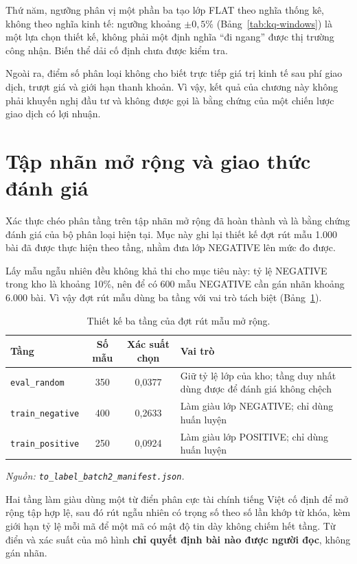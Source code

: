 Thứ năm, ngưỡng phân vị một phần ba tạo lớp FLAT theo nghĩa thống kê, không theo nghĩa kinh
tế: ngưỡng khoảng $\pm0{,}5\%$ (Bảng~\ref{tab:kq-windows}) là một lựa chọn thiết kế, không
phải một định nghĩa ``đi ngang'' được thị trường công nhận. Biến thể dải cố định chưa được
kiểm tra.

Ngoài ra, điểm số phân loại không cho biết trực tiếp giá trị kinh tế sau phí giao dịch,
trượt giá và giới hạn thanh khoản. Vì vậy, kết quả của chương này không phải khuyến nghị
đầu tư và không được gọi là bằng chứng của một chiến lược giao dịch có lợi nhuận.

\section{Tập nhãn mở rộng và giao thức đánh giá}
\label{sec:kq-mornhan}

Xác thực chéo phân tầng trên tập nhãn mở rộng đã hoàn thành và là bằng chứng đánh giá của
bộ phân loại hiện tại. Mục này ghi lại thiết kế đợt rút mẫu 1.000 bài đã được thực hiện
theo tầng, nhằm đưa lớp NEGATIVE lên mức đo được.

Lấy mẫu ngẫu nhiên đều không khả thi cho mục tiêu này: tỷ lệ NEGATIVE trong kho là khoảng
10\%, nên để có 600 mẫu NEGATIVE cần gán nhãn khoảng 6.000 bài. Vì vậy đợt rút mẫu dùng ba
tầng với vai trò tách biệt (Bảng~\ref{tab:kq-strata}).

\begin{table}[H]
  \centering
  \caption{Thiết kế ba tầng của đợt rút mẫu mở rộng.}
  \label{tab:kq-strata}
  \begin{tabular}{p{3.0cm} c c p{5.2cm}}
    \toprule
    Tầng & Số mẫu & Xác suất chọn & Vai trò \\
    \midrule
    \texttt{eval\_random} & 350 & 0,0377 & Giữ tỷ lệ lớp của kho; tầng duy nhất dùng được để đánh giá không chệch \\
    \texttt{train\_negative} & 400 & 0,2633 & Làm giàu lớp NEGATIVE; chỉ dùng huấn luyện \\
    \texttt{train\_positive} & 250 & 0,0924 & Làm giàu lớp POSITIVE; chỉ dùng huấn luyện \\
    \bottomrule
  \end{tabular}
\noindent\textit{Nguồn: \texttt{to\_label\_batch2\_manifest.json}.}
\end{table}

Hai tầng làm giàu dùng một từ điển phân cực tài chính tiếng Việt cố định để mở rộng tập hợp
lệ, sau đó rút ngẫu nhiên có trọng số theo số lần khớp từ khóa, kèm giới hạn tỷ lệ mỗi mã
để một mã có mật độ tin dày không chiếm hết tầng. Từ điển và xác suất của mô hình
\textbf{chỉ quyết định bài nào được người đọc}, không gán nhãn.

